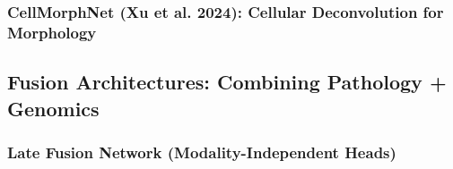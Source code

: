 \documentclass[11pt,a4paper]{article}
\begin{document}
\subsubsection{CellMorphNet (Xu et al. 2024): Cellular Deconvolution for Morphology}

\subsection{Fusion Architectures: Combining Pathology + Genomics}
\label{subsec:fusion}


\subsubsection{Late Fusion Network (Modality-Independent Heads)}
\end{document}
